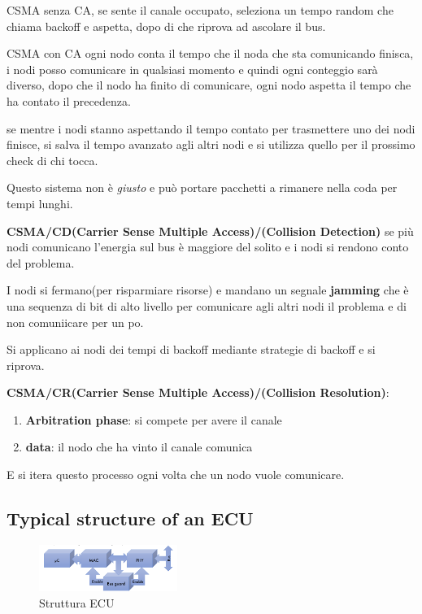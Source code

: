 CSMA senza CA, se sente il canale occupato, seleziona un tempo random che chiama backoff e aspetta, dopo di che riprova ad ascolare il bus.

CSMA con CA ogni nodo conta il tempo che il noda che sta comunicando finisca, i nodi posso comunicare in qualsiasi momento e quindi ogni conteggio sarà diverso, dopo che il nodo ha finito di comunicare, ogni nodo aspetta il tempo che ha contato il precedenza.

se mentre i nodi stanno aspettando il tempo contato per trasmettere uno dei nodi finisce, si salva il tempo avanzato agli altri nodi e si utilizza quello per il prossimo check di chi tocca.

Questo sistema non è \textit{giusto} e può portare pacchetti a rimanere nella coda per tempi lunghi.




\textbf{CSMA/CD(Carrier Sense Multiple Access)/(Collision Detection)} se più nodi comunicano l'energia sul bus è maggiore del solito e i nodi si rendono conto del problema.

I nodi si fermano(per risparmiare risorse) e mandano un segnale \textbf{jamming} che è una sequenza di bit di alto livello per comunicare agli altri nodi il problema e di non comuniicare per un po.

Si applicano ai nodi dei tempi di backoff mediante strategie di backoff e si riprova.

\textbf{CSMA/CR(Carrier Sense Multiple Access)/(Collision Resolution)}:
\begin{enumerate}
  \item \textbf{Arbitration phase}: si compete per avere il canale
  \item \textbf{data}: il nodo che ha vinto il canale comunica
\end{enumerate}

E si itera questo processo ogni volta che un nodo vuole comunicare.


\subsection{Typical structure of an ECU}
\begin{figure}[!ht]
  \centering
  \includegraphics[width=0.4\textwidth]{./images/ecu.png}
  \caption{Struttura ECU}
  \label{fir:struttura_ecu}
\end{figure}





